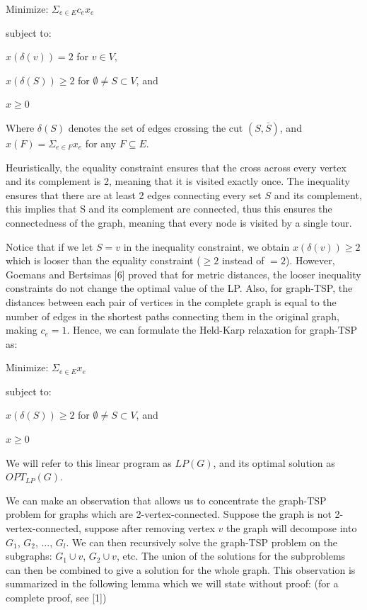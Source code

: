 \documentclass[12pt]{article}
\begin{document}
Minimize: $\Sigma_{e\in E}c_e x_e$

subject to:

$x(\delta(v))=2$ for $v\in V$,

$x(\delta(S)) \geq 2$ for $\emptyset \not= S \subset V$, and

$x \geq 0$

Where $\delta(S)$ denotes the set of edges crossing the cut $(S,\bar{S})$, and $x(F)=\Sigma_{e\in F} x_e$ for any $F \subseteq E$.

Heuristically, the equality constraint ensures that the cross across every vertex and its complement is 2, meaning that it is visited exactly once. The inequality ensures that there are at least 2 edges connecting every set $S$ and its complement, this implies that S and its complement are connected, thus this ensures the connectedness of the graph, meaning that every node is visited by a single tour.

Notice that if we let $S = v$ in the inequality constraint, we obtain $x(\delta(v)) \geq 2$ which is looser than the equality constraint ($\geq 2$ instead of $= 2$). However, Goemans and Bertsimas [6] proved that for metric distances, the looser inequality constraints do not change the optimal value of the LP. Also, for graph-TSP, the distances between each pair of vertices in the complete graph is equal to the number of edges in the shortest paths connecting them in the original graph, making $c_e = 1$. Hence, we can formulate the Held-Karp relaxation for graph-TSP as:

Minimize: $\Sigma_{e \in E} x_e$

subject to:

$x(\delta(S)) \geq 2$ for $\emptyset \not= S \subset V$, and

$x \geq 0$

We will refer to this linear program as $LP(G)$, and its optimal solution as $OPT_{LP}(G)$.

We can make an observation that allows us to concentrate the graph-TSP problem for graphs which are 2-vertex-connected. Suppose the graph is not 2-vertex-connected, suppose after removing vertex $v$ the graph will decompose into $G_1$, $G_2$, $\ldots$, $G_l$. We can then recursively solve the graph-TSP problem on the subgraphs: $G_1 \cup {v}$, $G_2 \cup {v}$, etc. The union of the solutions for the subproblems can then be combined to give a solution for the whole graph. This observation is summarized in the following lemma which we will state without proof: (for a complete proof, see [1])
\end{document}

